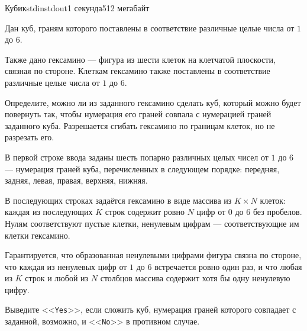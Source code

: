 \begin{problem}{Кубик}{stdin}{stdout}{1 секунда}{512 мегабайт}

Дан куб, граням которого поставлены в соответствие различные целые числа от $1$ до $6$.

Также дано гексамино --- фигура из шести клеток на клетчатой плоскости, связная по стороне. Клеткам гексамино также поставлены в соответствие различные целые числа от $1$ до $6$.

Определите, можно ли из заданного гексамино сделать куб, который можно будет повернуть так, чтобы нумерация его граней совпала с нумерацией граней заданного куба.
Разрешается сгибать гексамино по границам клеток, но не разрезать его.

\InputFile
В первой строке ввода заданы шесть попарно различных целых чисел от $1$ до $6$ --- нумерация граней куба, перечисленных в следующем порядке: передняя, задняя, левая, правая, верхняя, нижняя.

В последующих строках задаётся гексамино в виде массива из $K \times N$ клеток: каждая из последующих $K$ строк содержит ровно $N$ цифр от $0$ до $6$ без пробелов. Нулям соответствуют пустые клетки, ненулевым цифрам --- соответствующие им клетки гексамино. 

Гарантируется, что образованная ненулевыми цифрами фигура связна по стороне, что
каждая из ненулевых цифр от $1$ до $6$ встречается ровно один раз, и что любая из $K$ строк и любой из $N$ столбцов массива содержит хотя бы одну ненулевую цифру.


\OutputFile
Выведите <<\texttt{Yes}>>, если сложить куб, нумерация граней которого совпадает с заданной, возможно, и <<\texttt{No}>> в противном случае.


\Examples

\begin{example}
%
%
\end{example}

\end{problem}
